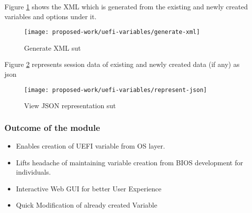 Figure \ref{fig:uefi-variable-generate-xml} shows the XML which is generated from the existing and newly created variables and options under it.
\begin{figure}[!htbp]
  \centering
  \texttt{[image: proposed-work/uefi-variables/generate-xml]}
  \caption{Generate XML \gls{sut}}\label{fig:uefi-variable-generate-xml}
\end{figure}

Figure \ref{fig:uefi-variable-represent-json} represents session data of existing and newly created data (if any) as json
\begin{figure}[!htbp]
  \centering
  \texttt{[image: proposed-work/uefi-variables/represent-json]}
  \caption{View JSON representation \gls{sut}}\label{fig:uefi-variable-represent-json}
\end{figure}


\subsubsection{Outcome of the module}
\begin{itemize}
  \item Enables creation of UEFI variable from OS layer.
  \item Lifts headache of maintaining variable creation from BIOS development for individuals.
  \item Interactive Web GUI for better User Experience
  \item Quick Modification of already created Variable
\end{itemize}

